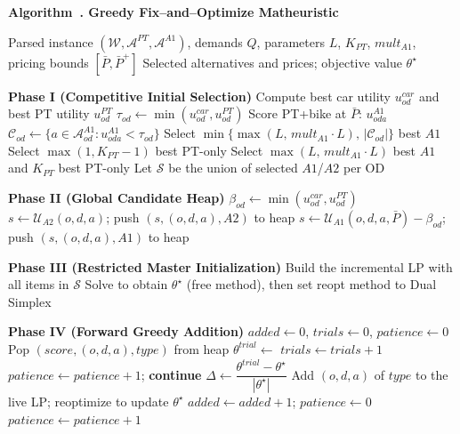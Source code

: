 \documentclass[11pt,a4paper]{article}
\newenvironment{breakablealgorithm}[1][]
  {%
   \refstepcounter{algorithm}%
   \par\medskip
   \noindent\textbf{Algorithm~\thealgorithm. #1}\par\medskip
  }
  {\medskip}
\begin{document}
\begin{breakablealgorithm}[Greedy Fix--and--Optimize Matheuristic]
\label{alg:greedy_fix_optimize}
\begin{algorithmic}[1]
\Require Parsed instance $(\mathcal{W}, \mathcal{A}^{PT}, \mathcal{A}^{A1})$, demands $Q$, parameters $L$, $K_{\!PT}$, $mult_{A1}$, pricing bounds $[\bar P, \bar P^{+}]$
\Ensure Selected alternatives and prices; objective value $\theta^\star$

\State \textbf{Phase I (Competitive Initial Selection)}
  \State Compute best car utility $u^{car}_{od}$ and best PT utility $u^{PT}_{od}$
  \State $\tau_{od}\gets \min(u^{car}_{od},u^{PT}_{od})$
  \State Score PT+bike at $\bar P$: $u^{A1}_{oda}$
  \State $\mathcal{C}_{od}\gets\{a\in\mathcal{A}^{A1}_{od}: u^{A1}_{oda}<\tau_{od}\}$
   
    \State Select $\min\{\max(L,\,mult_{A1}\!\cdot\!L),\,|\mathcal{C}_{od}|\}$ best $A1$
    \State Select $\max(1, K_{\!PT}-1)$ best PT-only
  \Else
    \State Select $\max(L,\,mult_{A1}\!\cdot\!L)$ best $A1$ and $K_{\!PT}$ best PT-only
  \EndIf
\EndFor
\State Let $\mathcal{S}$ be the union of selected $A1$/$A2$ per OD

\Statex
\State \textbf{Phase II (Global Candidate Heap)}
  \State $\beta_{od}\gets \min(u^{car}_{od},u^{PT}_{od})$
    \State $s\gets\mathcal{U}_{A2}(o,d,a)$; push $(s,(o,d,a),A2)$ to heap
  \EndFor
    \State $s\gets \mathcal{U}_{A1}(o,d,a,\bar P)-\beta_{od}$; push $(s,(o,d,a),A1)$ to heap
  \EndFor
\EndFor

\Statex
\State \textbf{Phase III (Restricted Master Initialization)}
\State Build the incremental LP with all items in $\mathcal{S}$
\State Solve to obtain $\theta^\star$ (free method), then set reopt method to Dual Simplex

\Statex
\State \textbf{Phase IV (Forward Greedy Addition)}
\State $added\gets 0$, $trials\gets 0$, $patience\gets 0$
  \State Pop $(score,(o,d,a),type)$ from heap
  \State $\theta^{trial}\gets$ 
  \State $trials\gets trials+1$
     \State $patience\gets patience+1$; \textbf{continue}
  \EndIf
  \State $\Delta \gets \dfrac{\theta^{trial}-\theta^\star}{|\theta^\star|}$
     \State Add $(o,d,a)$ of $type$ to the live LP; reoptimize to update $\theta^\star$
     \State $added\gets added+1$; $patience\gets 0$
  \Else
     \State $patience\gets patience+1$
  \EndIf
\EndWhile


\end{algorithmic}
\end{breakablealgorithm}
\end{document}
